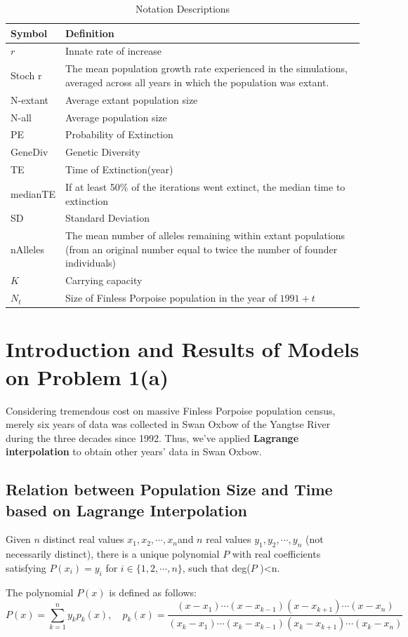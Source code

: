 \documentclass{mcmthesis}
\numberwithin{figure}{section}
\numberwithin{table}{section}
\numberwithin{equation}{section}
\begin{document}
\begin{table}[htpb!]
  \centering
  \caption{Notation Descriptions\citep{Vortex}} \label{Vortex_out}
  \begin{tabular}{m{2.5cm}<{\centering}|m{12.5cm}<{\centering}}
  \toprule[1.5pt]
  \textbf{Symbol} & \textbf{Definition} \\ \hline
  $ r $ & Innate rate of increase \\
  Stoch r & The mean population growth rate experienced in the simulations, averaged 
  across all years in which the population was extant. \\
  N-extant  & Average extant population size\\ 
  N-all  & Average population size \\
  PE  & Probability of Extinction \\
  GeneDiv  &  Genetic Diversity \\
  TE & Time of Extinction(year) \\
  medianTE & If at least 50\% of the iterations went extinct, 
  the median time to extinction \\
  SD & Standard Deviation \\
  nAlleles & The mean number of alleles remaining within extant populations 
  (from an original number equal to twice the number of founder individuals)\\
  $ K $ & Carrying capacity \\ 
  $ N_t $ & Size of Finless Porpoise population in the year of $ 1991 + t $ \\ 
  \bottomrule[1.5pt]
  \end{tabular}
  \end{table}



\section{Introduction and Results of Models on Problem 1(a)}


Considering tremendous cost on massive Finless Porpoise population 
census, merely six years of data was collected in Swan Oxbow of the Yangtse River
during the three decades since 1992. \citep*{Liuzhigang}
Thus, we've applied \textbf{Lagrange interpolation} to obtain other years' data
in Swan Oxbow.

 

\subsection{Relation between Population Size and Time based on Lagrange Interpolation}
Given $ n $ distinct real values $ x_1, x_2, \cdots , x_n $and $ n $
real values $ y_1, y_2,\cdots, y_n $ (not necessarily distinct), there
is a unique polynomial $ P $ with real coefficients satisfying 
$ P(x_i)= y_i $ for $ i \in \{1,2,\cdots,n\} $, such that deg($ P $ )<n.
\par
The polynomial $ P(x) $ is defined as follows:   
$$
  P(x) = \sum \limits _{k = 1}^ny_kp_k(x),\quad
  p_k(x) = \frac{(x-x_1)\cdots (x-x_{k-1})(x-x_{k+1})\cdots (x-x_n)}{
    (x_k-x_1)\cdots (x_k-x_{k-1})(x_k-x_{k+1})\cdots (x_k-x_n)
  }
$$
\end{document}
